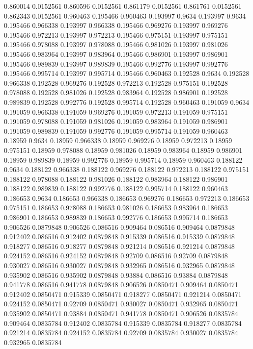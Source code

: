 0.860014 0.0152561
0.860596 0.0152561
0.861179 0.0152561
0.861761 0.0152561
0.862343 0.0152561
0.960463 0.195466
0.960463 0.193997
0.9634 0.193997
0.9634 0.195466
0.966338 0.193997
0.966338 0.195466
0.969276 0.193997
0.969276 0.195466
0.972213 0.193997
0.972213 0.195466
0.975151 0.193997
0.975151 0.195466
0.978088 0.193997
0.978088 0.195466
0.981026 0.193997
0.981026 0.195466
0.983964 0.193997
0.983964 0.195466
0.986901 0.193997
0.986901 0.195466
0.989839 0.193997
0.989839 0.195466
0.992776 0.193997
0.992776 0.195466
0.995714 0.193997
0.995714 0.195466
0.960463 0.192528
0.9634 0.192528
0.966338 0.192528
0.969276 0.192528
0.972213 0.192528
0.975151 0.192528
0.978088 0.192528
0.981026 0.192528
0.983964 0.192528
0.986901 0.192528
0.989839 0.192528
0.992776 0.192528
0.995714 0.192528
0.960463 0.191059
0.9634 0.191059
0.966338 0.191059
0.969276 0.191059
0.972213 0.191059
0.975151 0.191059
0.978088 0.191059
0.981026 0.191059
0.983964 0.191059
0.986901 0.191059
0.989839 0.191059
0.992776 0.191059
0.995714 0.191059
0.960463 0.18959
0.9634 0.18959
0.966338 0.18959
0.969276 0.18959
0.972213 0.18959
0.975151 0.18959
0.978088 0.18959
0.981026 0.18959
0.983964 0.18959
0.986901 0.18959
0.989839 0.18959
0.992776 0.18959
0.995714 0.18959
0.960463 0.188122
0.9634 0.188122
0.966338 0.188122
0.969276 0.188122
0.972213 0.188122
0.975151 0.188122
0.978088 0.188122
0.981026 0.188122
0.983964 0.188122
0.986901 0.188122
0.989839 0.188122
0.992776 0.188122
0.995714 0.188122
0.960463 0.186653
0.9634 0.186653
0.966338 0.186653
0.969276 0.186653
0.972213 0.186653
0.975151 0.186653
0.978088 0.186653
0.981026 0.186653
0.983964 0.186653
0.986901 0.186653
0.989839 0.186653
0.992776 0.186653
0.995714 0.186653
0.906526 0.0879848
0.906526 0.086516
0.909464 0.086516
0.909464 0.0879848
0.912402 0.086516
0.912402 0.0879848
0.915339 0.086516
0.915339 0.0879848
0.918277 0.086516
0.918277 0.0879848
0.921214 0.086516
0.921214 0.0879848
0.924152 0.086516
0.924152 0.0879848
0.92709 0.086516
0.92709 0.0879848
0.930027 0.086516
0.930027 0.0879848
0.932965 0.086516
0.932965 0.0879848
0.935902 0.086516
0.935902 0.0879848
0.93884 0.086516
0.93884 0.0879848
0.941778 0.086516
0.941778 0.0879848
0.906526 0.0850471
0.909464 0.0850471
0.912402 0.0850471
0.915339 0.0850471
0.918277 0.0850471
0.921214 0.0850471
0.924152 0.0850471
0.92709 0.0850471
0.930027 0.0850471
0.932965 0.0850471
0.935902 0.0850471
0.93884 0.0850471
0.941778 0.0850471
0.906526 0.0835784
0.909464 0.0835784
0.912402 0.0835784
0.915339 0.0835784
0.918277 0.0835784
0.921214 0.0835784
0.924152 0.0835784
0.92709 0.0835784
0.930027 0.0835784
0.932965 0.0835784
